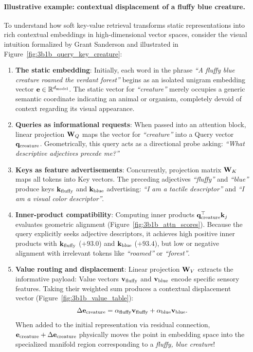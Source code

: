 \documentclass[../../main.tex]{subfiles}
\begin{document}
\paragraph{Illustrative example: contextual displacement of a fluffy blue creature.}
To understand how soft key-value retrieval transforms static representations into rich contextual embeddings in high-dimensional vector spaces, consider the visual intuition formalized by Grant Sanderson \cite{sanderson2024attention} and illustrated in Figure~\ref{fig:3b1b_query_key_creature}:
\begin{enumerate}
    \item \textbf{The static embedding}: Initially, each word in the phrase \emph{``A fluffy blue creature roamed the verdant forest''} begins as an isolated unigram embedding vector $\mathbf{e} \in \mathbb{R}^{d_{\text{model}}}$. The static vector for \emph{``creature''} merely occupies a generic semantic coordinate indicating an animal or organism, completely devoid of context regarding its visual appearance.
    \item \textbf{Queries as informational requests}: When passed into an attention block, linear projection $\mathbf{W}_Q$ maps the vector for \emph{``creature''} into a Query vector $\mathbf{q}_{\text{creature}}$. Geometrically, this query acts as a directional probe asking: \emph{``What descriptive adjectives precede me?''}
    \item \textbf{Keys as feature advertisements}: Concurrently, projection matrix $\mathbf{W}_K$ maps all tokens into Key vectors. The preceding adjectives \emph{``fluffy''} and \emph{``blue''} produce keys $\mathbf{k}_{\text{fluffy}}$ and $\mathbf{k}_{\text{blue}}$ advertising: \emph{``I am a tactile descriptor''} and \emph{``I am a visual color descriptor''}.
    \item \textbf{Inner-product compatibility}: Computing inner products $\mathbf{q}_{\text{creature}}^\top \mathbf{k}_j$ evaluates geometric alignment (Figure~\ref{fig:3b1b_attn_scores}). Because the query explicitly seeks adjective descriptors, it achieves high positive inner products with $\mathbf{k}_{\text{fluffy}}$ ($+93.0$) and $\mathbf{k}_{\text{blue}}$ ($+93.4$), but low or negative alignment with irrelevant tokens like \emph{``roamed''} or \emph{``forest''}.
    \item \textbf{Value routing and displacement}: Linear projection $\mathbf{W}_V$ extracts the informative payload: Value vectors $\mathbf{v}_{\text{fluffy}}$ and $\mathbf{v}_{\text{blue}}$ encode specific sensory features. Taking their weighted sum produces a contextual displacement vector (Figure~\ref{fig:3b1b_value_table}):
    \begin{equation}
    \label{eq:fluffy_blue_displacement}
    \Delta \mathbf{e}_{\text{creature}} = \alpha_{\text{fluffy}} \mathbf{v}_{\text{fluffy}} + \alpha_{\text{blue}} \mathbf{v}_{\text{blue}}.
    \end{equation}
    When added to the initial representation via residual connection, $\mathbf{e}_{\text{creature}} + \Delta \mathbf{e}_{\text{creature}}$ physically moves the point in embedding space into the specialized manifold region corresponding to a \emph{fluffy, blue creature}!
\end{enumerate}
\end{document}

